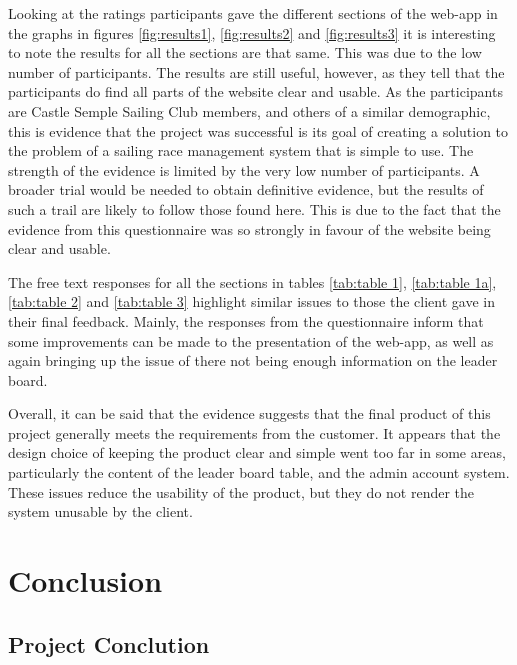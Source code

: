 \documentclass{l4proj}
\begin{document}
Looking at the ratings participants gave the different sections of the web-app in the graphs in figures \ref{fig:results1}, \ref{fig:results2} and \ref{fig:results3} it is interesting to note the results for all the sections are that same. This was due to the low number of participants. The results are still useful, however, as they tell that the participants do find all parts of the website clear and usable. As the participants are Castle Semple Sailing Club members, and others of a similar demographic, this is evidence that the project was successful is its goal of creating a solution to the problem of a sailing race management system that is simple to use. The strength of the evidence is limited by the very low number of participants. A broader trial would be needed to obtain definitive evidence, but the results of such a trail are likely to follow those found here. This is due to the fact that the evidence from this questionnaire was so strongly in favour of the website being clear and usable.

The free text responses for all the sections in tables \ref{tab:table 1}, \ref{tab:table 1a}, \ref{tab:table 2} and \ref{tab:table 3} highlight similar issues to those the client gave in their final feedback. Mainly, the responses from the questionnaire inform that some improvements can be made to the presentation of the web-app, as well as again bringing up the issue of there not being enough information on the leader board.

Overall, it can be said that the evidence suggests that the final product of this project generally meets the requirements from the customer. It appears that the design choice of keeping the product clear and simple went too far in some areas, particularly the content of the leader board table, and the admin account system. These issues reduce the usability of the product, but they do not render the system unusable by the client.



\chapter{Conclusion}

\section{Project Conclution}
\end{document}
